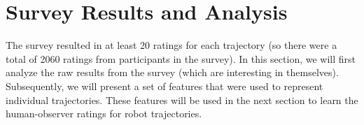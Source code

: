 \documentclass[letterpaper, 10 pt, conference]{ieeeconf}  %
\begin{document}


\section{Survey Results and Analysis}
\label{sec:raw_results}
The survey resulted in at least 20 ratings for each trajectory (so there were a total of 2060 ratings from participants in the survey). In this section, we will first analyze the raw results from the survey (which are interesting in themselves). Subsequently, we will present a set of features that were used to represent individual trajectories. These features will be used in the next section to learn the human-observer ratings for robot trajectories. 
\end{document}
